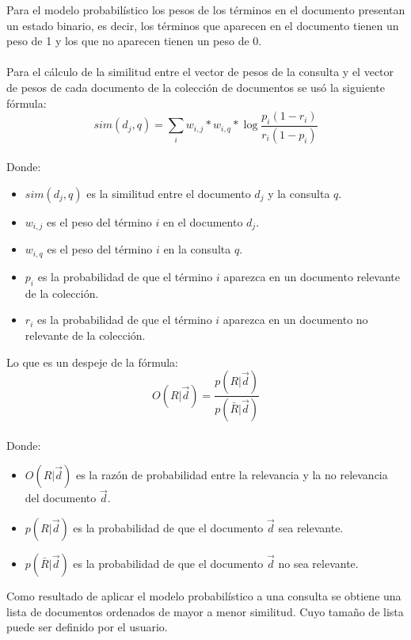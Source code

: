 \documentclass{llncs}
\begin{document}
	Para el modelo probabil\'istico los pesos de los t\'erminos en el documento presentan un estado binario, es decir,
	los t\'erminos que aparecen en el documento tienen un peso de 1 y los que no aparecen tienen un peso de 0.\\
	\\
	Para el c\'alculo de la similitud entre el vector de pesos de la consulta y el vector de pesos de cada documento de la colecci\'on
	de documentos se us\'o la siguiente f\'ormula:\\
	\begin{equation}
		sim(d_{j}, q) = \sum_{i} w_{i,j} * w_{i,q} * \log{\frac{p_{i}(1 - r_{i})}{r_{i}(1 - p_{i})}}
	\end{equation}
	\\
	Donde: \\
	\begin{itemize}
		\item $sim(d_{j}, q)$ es la similitud entre el documento $d_{j}$ y la consulta $q$.
		\item $w_{i,j}$ es el peso del t\'ermino $i$ en el documento $d_{j}$.
		\item $w_{i,q}$ es el peso del t\'ermino $i$ en la consulta $q$.
		\item $p_{i}$ es la probabilidad de que el t\'ermino $i$ aparezca en un documento relevante de la colecci\'on.
		\item $r_{i}$ es la probabilidad de que el t\'ermino $i$ aparezca en un documento no relevante de la colecci\'on.
	\end{itemize}

	Lo que es un despeje de la f\'ormula:\\
	\begin{equation}
		O(R|\vec{d}) = \frac{p(R|\vec{d})}{p(\bar{R}|\vec{d})}
    \end{equation}
	\\
	Donde: \\
	\begin{itemize}
		\item $O(R|\vec{d})$ es la raz\'on de probabilidad entre la relevancia y la no relevancia del documento $\vec{d}$.
		\item $p(R|\vec{d})$ es la probabilidad de que el documento $\vec{d}$ sea relevante.
		\item $p(\bar{R}|\vec{d})$ es la probabilidad de que el documento $\vec{d}$ no sea relevante.
    \end{itemize}


	Como resultado de aplicar el modelo probabil\'istico a una consulta se obtiene una lista de documentos ordenados de mayor a menor similitud.
	Cuyo tama\~no de lista puede ser definido por el usuario.\\
\end{document}
